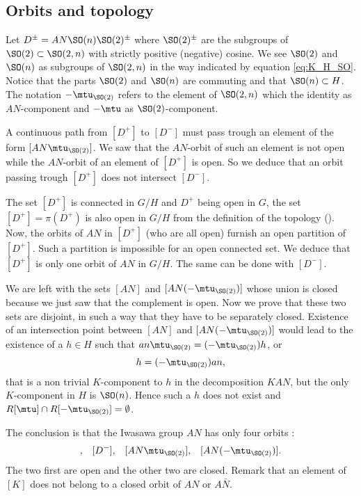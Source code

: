 \subsection{Orbits  and topology}
\label{PgTopoOrb}

Let  $D^{\pm}=AN\SO(n)\SO(2)^{\pm}$ where $\SO(2)^{\pm}$ are the subgroups of $\SO(2)\subset \SO(2,n)$ with strictly positive (negative) cosine. We see $\SO(2)$ and $\SO(n)$ as subgroups of $\SO(2,n)$ in the way indicated by equation \eqref{eq:K_H_SO}. Notice that the parts $\SO(2)$ and $\SO(n)$ are commuting and that $\SO(n)\subset H$. The notation $-\mtu_{\SO(2)}$ refers to the element of $\SO(2,n)$ which the identity as $AN$-component and $-\mtu$ as $\SO(2)$-component.

A continuous path from $[D^+]$ to $[D^-]$ must pass trough an element of the form $[AN\mtu_{\SO(2)}]$. We saw that the $AN$-orbit of such an element is not open while the $AN$-orbit of an element of $[D^+]$ is open. So we deduce that an orbit passing trough $[D^+]$ does not intersect $[D^-]$.

The set $[D^+]$ is connected in $G/H$ and $D^+$  being open in $G$, the set $[D^+]=\pi(D^+)$ is also open in $G/H$ from the definition of the topology (). Now, the orbits of $AN$ in $[D^+]$ (who are all open) furnish an open partition of $[D^+]$. Such a partition is impossible for an open connected set. We deduce that $[D^+]$ is only one orbit of $AN$ in $G/H$. The same can be done with $[D^-]$.

We are left with the sets $[AN]$ and $[AN(-\mtu_{\SO(2)})]$ whose union is closed because we just saw that the complement is open. Now we prove that these two sets are disjoint, in such a way that they have to be separately closed. Existence of an intersection point between $[AN]$ and $[AN(-\mtu_{\SO(2)})]$ would lead to the existence of a $h\in H$ such that $an\mtu_{\SO(2)}=(-\mtu_{\SO(2)})h$, or
\[ 
  h=(-\mtu_{\SO(2)})an,
\]
that is a non trivial $K$-component to $h$ in the decomposition $KAN$, but the only $K$-component in $H$ is $\SO(n)$. Hence such a $h$ does not exist and $R[\mtu]\cap R[-\mtu_{\SO(2)}]=\emptyset$.

The conclusion is that the Iwasawa group $AN$ has only four orbits :
\begin{align}
[D^+],&&[D^-],&&[AN\mtu_{\SO(2)}],&&[AN(-\mtu_{\SO(2)})].
\end{align}
The two first are open and the other two are closed. Remark\label{PgNoticeKpassung} that an element of $[K]$ does not belong to a closed orbit of $AN$ or $A\bar N$.


